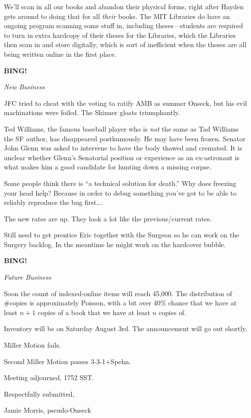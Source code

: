 \documentclass[12pt]{article}
\newcommand{\bing}{{\bf BING!} }
\newcommand{\goto}[1]{\bing \vskip 12pt \centerline{{\em{#1}}}}
\begin{document}
We'll scan in all our books and abandon their physical forms, right after
Hayden gets around to doing that for all \emph{their} books.  The MIT
Libraries do have an ongoing program scanning some stuff in, including
theses---students are required to turn in extra hardcopy of their theses
for the Libraries, which the Libraries then scan in and store digitally,
which is sort of inefficient when the theses are all being written online
in the first place.

\goto{New Business}

JFC tried to cheat with the voting to ratify AMB as summer Onseck, but
his evil machinations were foiled.  The Skinner gloats triumphantly.

Ted Williams, the famous baseball player who is \emph{not} the same
as Tad Williams the SF author, has disappeared posthumously.  He may have
been frozen.  Senator John Glenn was asked to intervene to have the body
thawed and cremated.  It is unclear whether Glenn's Senatorial position or
experience as an ex-astronaut is what makes him a good candidate for hunting
down a missing corpse.

Some people think there is ``a technical solution for death.''  Why does
freezing your head help?  Because in order to debug something you've got
to be able to reliably reproduce the bug first\ldots.

The new rates are up.  They look a lot like the previous/current rates.

Still need to get prentice Eric together with the Surgeon so he can work
on the Surgery backlog.  In the meantime he might work on the hardcover
bubble.

\goto{Future Business}

Soon the count of indexed-online items will reach 45,000.
The distribution of \#copies is approximately Poisson, with a
bit over 40\% chance that we have at least $n+1$ copies of a book that we
have at least $n$ copies of.

Inventory will be on Saturday August 3rd.  The announcement will go out 
shortly.

Miller Motion fails.

Second Miller Motion passes 3-3-1+Spehn.

\vspace{12pt}

\noindent
Meeting adjourned, 1752 SST.

\vspace{18pt}

\centerline{Respectfully submitted,}
\centerline{Jamie Morris, pseudo-Onseck}
\end{document}
